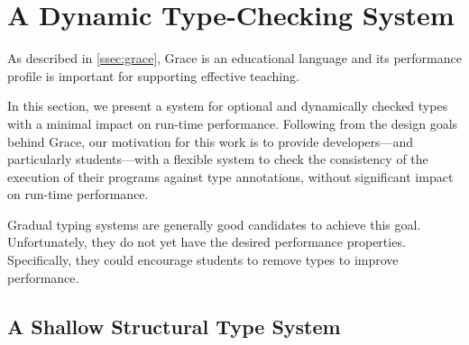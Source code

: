
\section{A Dynamic Type-Checking System}
\label{sec:method}




As described in \cref{ssec:grace},
Grace is an educational language and its performance profile
is important for supporting effective teaching. 

In this section,
we present a system for optional and dynamically checked types
with a minimal impact on run-time performance.
Following from the design goals behind Grace,
our motivation for this work
is to provide developers---and particularly students---with a flexible system 
to check the consistency of the execution of their programs
against type annotations,
without significant impact on run-time performance.

Gradual typing systems are generally good candidates to achieve this goal.
Unfortunately, they do not yet have the desired performance properties\citep{Takikawa2016,Vitousek2017,Muehlboeck2017,Bauman2017,Richards2017,Greenman2018}.
Specifically, they could encourage students to remove types
to improve performance.





\subsection{A Shallow Structural Type System}

